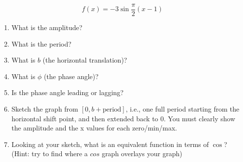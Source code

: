 \documentclass[letterpaper,12pt,fleqn]{article}
\begin{document}
\begin{enumerate}
\[f(x)=-3\sin\frac{\pi}{2}(x-1)\]
\begin{enumerate}
\item What is the amplitude?
\vspace{1in}
\item What is the period?
\vspace{1in}
\item What is $b$ (the horizontal translation)?
\vspace{1in}
\item What is $\phi$ (the phase angle)?
\vspace{1in}
\item Is the phase angle leading or lagging?
\newpage
\item Sketch the graph from $[0, b+\mbox{period}]$, i.e., one full period
starting from the horizontal shift point, and then extended back to 0. You must
clearly show the amplitude and the x values for each zero/min/max.
\vspace{4in}
\item Looking at your sketch, what is an equivalent function in terms of
$\cos$? (Hint: try to find where a $cos$ graph overlays your graph)
\end{enumerate}

\end{enumerate}
\end{document}
